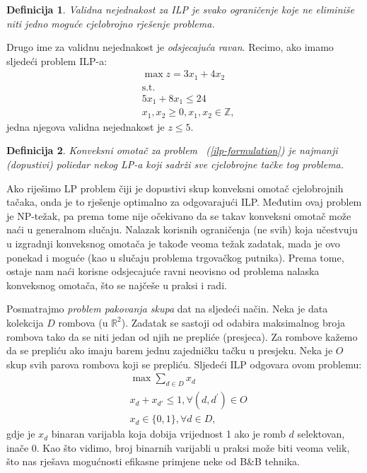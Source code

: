 \documentclass[a4paper, utf8, 11pt, colorlinks]{book}
\newtheorem{definition}{Definicija}
\begin{document}
 \begin{definition}{Validna nejednakost} za ILP je svako ograničenje koje ne eliminiše niti   jedno moguće cjelobrojno rješenje problema.
 \end{definition}
 Drugo ime za {validnu nejednakost} je \emph{odsjecajuća ravan}.
Recimo, ako imamo sljedeći problem ILP-a:
\begin{align*}
    &\max z = 3x_1 + 4 x_2 \\
    &\mbox{s.t.} \\
    &5x_1 + 8x_1 \leq 24 \\
    & x_1, x_2 \geq 0, x_1,x_2\in \mathbb{Z},
\end{align*}
jedna njegova validna nejednakost je $z \leq 5$. 

\begin{definition}
      Konveksni omotač za problem  ~(\ref{ilp-formulation}) je najmanji (dopustivi) poliedar nekog LP-a koji sadrži sve cjelobrojne tačke tog problema.
\end{definition}
Ako riješimo LP problem čiji je dopustivi skup konveksni omotač cjelobrojnih tačaka, onda je to rješenje optimalno za odgovarajući ILP. Međutim ovaj problem je  NP-težak, pa prema tome nije očekivano da se takav konveksni omotač može naći u generalnom slučaju. Nalazak korisnih ograničenja (ne svih) koja učestvuju u izgradnji konveksnog omotača je takođe veoma težak zadatak, mada je ovo ponekad i moguće (kao u slučaju problema trgovačkog putnika). Prema tome, ostaje nam naći korisne odsjecajuće ravni neovisno od problema nalaska konveksnog omotača, što se najčeše  u praksi i radi. 

Posmatrajmo   \emph{problem pakovanja skupa} dat na sljedeći način. Neka je data kolekcija $D$ rombova (u $\mathbb{R}^2$). 
Zadatak se sastoji od odabira maksimalnog broja rombova tako da se niti jedan od njih ne prepliće (presjeca).  Za rombove kažemo da se prepliću ako imaju barem jednu zajedničku tačku u presjeku. 
Neka je $O$ skup svih parova rombova koji se prepliću. Sljedeći ILP odgovara ovom problemu:
\begin{align*}
    &\max \sum_{d\in D}x_d\\
    & x_d + x_{d'} \leq 1, \forall (d, d^{'}) \in O \\
    & x_d \in \{0,1\}, \forall d \in D,
\end{align*}
gdje je $x_d$ binaran varijabla koja dobija vrijednost 1 ako je romb $d$ selektovan, inače 0. 
Kao što vidimo, broj binarnih varijabli u praksi može biti veoma velik, što nas rješava mogućnosti efikasne primjene neke od B\&B tehnika.
\end{document}
